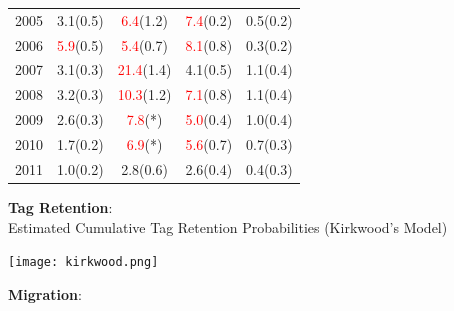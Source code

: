 \documentclass[paperwidth=58in,paperheight=47in,portrait]{baposter}
\begin{document}
\begin{poster}
{\begin{center}
{\begin{tabular}{r|c|c|c|c}
        2005 &   3.1(0.5) &   \textcolor{red}{6.4}(1.2) &   \textcolor{red}{7.4}(0.2) &   0.5(0.2) \\

        2006 &   \textcolor{red}{5.9}(0.5) &  \textcolor{red}{5.4}(0.7) &   \textcolor{red}{8.1}(0.8) &   0.3(0.2) \\

        2007 &   3.1(0.3) &  \textcolor{red}{21.4}(1.4) &   4.1(0.5) &   1.1(0.4) \\

        2008 &   3.2(0.3) &  \textcolor{red}{10.3}(1.2) &   \textcolor{red}{7.1}(0.8) &   1.1(0.4) \\

        2009 &   2.6(0.3) &        \textcolor{red}{7.8}(*) &   \textcolor{red}{5.0}(0.4) &   1.0(0.4) \\

        2010 &   1.7(0.2) &        \textcolor{red}{6.9}(*) &   \textcolor{red}{5.6}(0.7) &   0.7(0.3) \\

        2011 &   1.0(0.2) &   2.8(0.6) &   2.6(0.4) &   0.4(0.3) \\

\end{tabular}}\end{center}

\begin{multicols}{2}    %

\textbf{Tag Retention}: \\
Estimated Cumulative Tag Retention Probabilities (Kirkwood's Model)

\texttt{[image: kirkwood.png]}

\textbf{Migration}:\\

\end{multicols}}
\end{poster}
\end{document}
